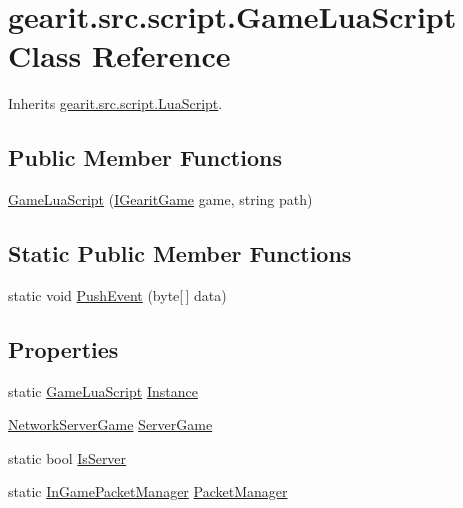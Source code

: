 \hypertarget{classgearit_1_1src_1_1script_1_1_game_lua_script}{\section{gearit.\+src.\+script.\+Game\+Lua\+Script Class Reference}
\label{classgearit_1_1src_1_1script_1_1_game_lua_script}
}


Inherits \hyperlink{classgearit_1_1src_1_1script_1_1_lua_script}{gearit.\+src.\+script.\+Lua\+Script}.

\subsection*{Public Member Functions}
\begin{DoxyCompactItemize}
\item 
\hyperlink{classgearit_1_1src_1_1script_1_1_game_lua_script_a1471e58cf4913c61624ec5ba737a5949}{Game\+Lua\+Script} (\hyperlink{interfacegearit_1_1src_1_1game_1_1_i_gearit_game}{I\+Gearit\+Game} game, string path)
\end{DoxyCompactItemize}
\subsection*{Static Public Member Functions}
\begin{DoxyCompactItemize}
\item 
static void \hyperlink{classgearit_1_1src_1_1script_1_1_game_lua_script_a4ec4bde1976eaaff62f89af3501199e0}{Push\+Event} (byte\mbox{[}$\,$\mbox{]} data)
\end{DoxyCompactItemize}
\subsection*{Properties}
\begin{DoxyCompactItemize}
\item 
static \hyperlink{classgearit_1_1src_1_1script_1_1_game_lua_script}{Game\+Lua\+Script} \hyperlink{classgearit_1_1src_1_1script_1_1_game_lua_script_acf86efcd940e71701954c262859bb9d5}{Instance}
\item 
\hyperlink{classgearit_1_1src_1_1_network_1_1_network_server_game}{Network\+Server\+Game} \hyperlink{classgearit_1_1src_1_1script_1_1_game_lua_script_a4ff05d299d3e333f3a4ece87acec786d}{Server\+Game}
\item 
static bool \hyperlink{classgearit_1_1src_1_1script_1_1_game_lua_script_ad55849404c393c36dab275a60a265b0e}{Is\+Server}
\item 
static \hyperlink{classgearit_1_1src_1_1_network_1_1_in_game_packet_manager}{In\+Game\+Packet\+Manager} \hyperlink{classgearit_1_1src_1_1script_1_1_game_lua_script_a9f9197e9c2ed0186cee1a57b695b38eb}{Packet\+Manager}
\end{DoxyCompactItemize}


